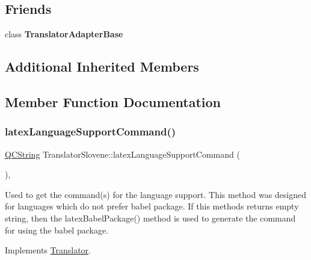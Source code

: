 \subsection*{Friends}
\begin{DoxyCompactItemize}
\item 
\mbox{\label{class_translator_slovene_a6a27329ec4f8a11907f075e9052d96f7}} 
class {\bfseries Translator\+Adapter\+Base}
\end{DoxyCompactItemize}
\subsection*{Additional Inherited Members}


\subsection{Member Function Documentation}
\mbox{\label{class_translator_slovene_a8c1f38606d2f5bbc776ddaeba44539dc}} 
\subsubsection{\texorpdfstring{latexLanguageSupportCommand()}{latexLanguageSupportCommand()}}
{\footnotesize\ttfamily \mbox{\hyperlink{class_q_c_string}{Q\+C\+String}} Translator\+Slovene\+::latex\+Language\+Support\+Command (\begin{DoxyParamCaption}{ }\end{DoxyParamCaption})\hspace{0.3cm}{\ttfamily [inline]}, {\ttfamily [virtual]}}

Used to get the command(s) for the language support. This method was designed for languages which do not prefer babel package. If this methods returns empty string, then the latex\+Babel\+Package() method is used to generate the command for using the babel package. 

Implements \mbox{\hyperlink{class_translator}{Translator}}.

\mbox{\label{class_translator_slovene_a03a83cef286998d2ac169efe64ea200b}} 
